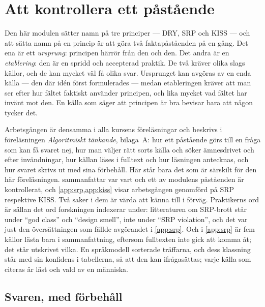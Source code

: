 \chapter{Att kontrollera ett påstående}
\label{app:verifiera-funktioner}

Den här modulen sätter namn på tre principer --- DRY, SRP och KISS --- och
att sätta namn på en princip är att göra två faktapåståenden på en gång.
Det ena är ett \emph{ursprung}: principen härrör från den och den.  Det
andra är en \emph{etablering}: den är en spridd och accepterad praktik.
De två kräver olika slags källor, och de kan mycket väl få olika svar.
Ursprunget kan avgöras av en enda källa --- den där idén först
formulerades --- medan etableringen kräver att man ser efter hur fältet
faktiskt använder principen, och lika mycket vad fältet har invänt mot
den.  En källa som säger att principen är bra bevisar bara att någon
tycker det.

Arbetsgången är densamma i alla kursens föreläsningar och beskrivs i
föreläsningen \emph{Algoritmiskt tänkande}, bilaga~A: hur ett påstående
görs till en fråga som kan få svaret nej, hur man väljer rätt sorts
källa och söker ämnesdrivet och efter invändningar, hur källan läses i
fulltext och hur läsningen antecknas, och hur svaret skrivs ut med sina
förbehåll.  Här står bara det som är särskilt för den här föreläsningen.
 sammanfattar var vart och ett av modulens
påståenden är kontrollerat, och \cref{app:srp,app:kiss} visar
arbetsgången genomförd på SRP respektive KISS.  Två saker i dem är värda
att känna till i förväg.  Praktikerns ord är sällan det ord forskningen
indexerar under: litteraturen om SRP-brott står under \enquote{god
class} och \enquote{design smell}, inte under \enquote{SRP violation},
och det var just den översättningen som fällde avgörandet i
\cref{app:srp}.  Och i \cref{app:srp} är fem källor lästa bara i
sammanfattning, eftersom fulltexten inte gick att komma åt; det står
utskrivet vilka.%
En språkmodell sorterade träffarna, och dess klassning står med sin
konfidens i tabellerna, så att den kan ifrågasättas; varje källa som
citeras är läst och vald av en människa.

\section{Svaren, med förbehåll}

